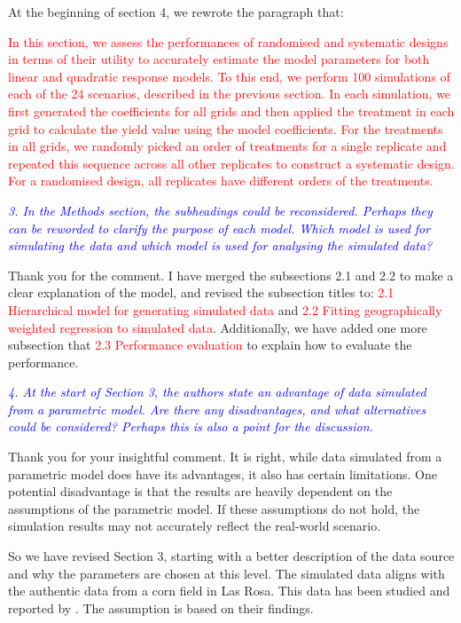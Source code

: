 \documentclass[a4paper]{article}   	%
\newcommand{\revision}[1]{\textcolor{red}{#1}}
\newcommand{\reviewer}[1]{\textcolor{blue}{\textit{#1}}}
\begin{document}
At the beginning of section 4, we rewrote the paragraph that: 

\revision{In this section, we assess the performances of randomised and systematic designs in terms of their utility to accurately estimate the model parameters for both linear and quadratic response models. To this end, we perform 100 simulations of each of the 24 scenarios, described in the previous section. In each simulation, we first generated the coefficients for all grids and then applied the treatment in each grid to calculate the yield value using the model coefficients. For the treatments in all grids, we randomly picked an order of treatments for a single replicate and repeated this sequence across all other replicates to construct a systematic design. For a randomised design, all replicates have different orders of the treatments.}


\reviewer{3. In the Methods section, the subheadings could be reconsidered. Perhaps they can be reworded to clarify the purpose of each model. Which model is used for simulating the data and which model is used for analysing the simulated data?}

Thank you for the comment. I have merged the subsections 2.1 and 2.2 to make a clear explanation of the model, and revised the subsection titles to: \revision{2.1 Hierarchical model for generating simulated data} and \revision{2.2 Fitting geographically weighted regression to simulated data}. Additionally, we have added one more subsection that \revision{2.3 Performance evaluation} to explain how to evaluate the performance. 


\reviewer{4. At the start of Section 3, the authors state an advantage of data simulated from a parametric model. Are there any disadvantages, and what alternatives could be considered? Perhaps this is also a point for the discussion.}

Thank you for your insightful comment. It is right, while data simulated from a parametric model does have its advantages, it also has certain limitations. One potential disadvantage is that the results are heavily dependent on the assumptions of the parametric model. If these assumptions do not hold, the simulation results may not accurately reflect the real-world scenario.

So we have revised Section 3, starting with a better description of the data source and why the parameters are chosen at this level. The simulated data aligns with the authentic data from a corn field in Las Rosa. This data has been studied and reported by \textcite{Rakshit2020Novel, Cao2022Bayesian}. The assumption is based on their findings. 
\end{document}
